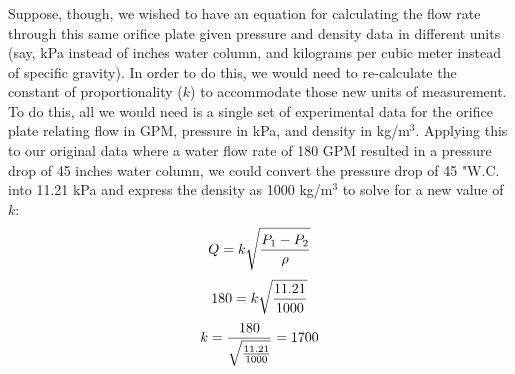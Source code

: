 \documentclass{beamer}
\begin{document}
%
\begin{frame}
	\frametitle{}

	



Suppose, though, we wished to have an equation for calculating the flow rate through this same orifice plate given pressure and density data in different units (say, kPa instead of inches water column, and kilograms per cubic meter instead of specific gravity).  In order to do this, we would need to re-calculate the constant of proportionality ($k$) to accommodate those new units of measurement.  To do this, all we would need is a single set of experimental data for the orifice plate relating flow in GPM, pressure in kPa, and density in kg/m$^{3}$.
%
Applying this to our original data where a water flow rate of 180 GPM resulted in a pressure drop of 45 inches water column, we could convert the pressure drop of 45 "W.C. into 11.21 kPa and express the density as 1000 kg/m$^{3}$ to solve for a new value of $k$:
%
$$Q = k \sqrt{{P_1 - P_2} \over \rho}$$
%
$$180 = k \sqrt{{11.21} \over 1000}$$
%
$$k = {180 \over \sqrt{11.21 \over 1000}} = 1700$$
%
\end{frame}
%
%
%
%
%
%
%
%
%
%
%
\end{document}
